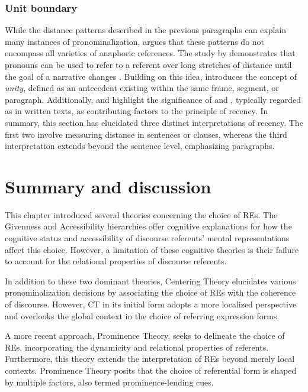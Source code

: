 \subsubsection{Unit boundary} While the distance patterns described in the previous paragraphs can explain many instances of pronominalization, \citet{Fox1987} argues that these patterns do not encompass all varieties of anaphoric references.  The study by \citeauthor{Fox1987} demonstrates that pronouns can be used to refer to a referent over long stretches of distance until the goal of a narrative changes \citep[cited in][]{Smith2003}. Building on this idea, \citet{ariel1990accessing} introduces the concept of \textit{unity}, defined as an antecedent existing within the same frame, segment, or paragraph. Additionally, \citet{vonk1992use} and \citet{Tomlin1987} highlight the significance of  and , typically regarded as  in written texts, as contributing factors to the principle of recency.
In summary, this section has elucidated three distinct interpretations of recency. The first two involve measuring distance in sentences or clauses, whereas the third interpretation extends beyond the sentence level, emphasizing paragraphs.


\section{Summary and discussion}
\begin{sloppypar}
This chapter introduced several theories concerning the choice of REs. The Givenness and Accessibility hierarchies offer cognitive explanations for how the cognitive status and accessibility of discourse referents' mental representations affect this choice. However, a limitation of these cognitive theories is their failure to account for the relational properties of discourse referents. 
\end{sloppypar}

In addition to these two dominant theories, Centering Theory elucidates various pronominalization decisions by associating the choice of REs with the coherence of discourse. However, CT in its initial form adopts a more localized perspective and overlooks the global context in the choice of referring expression forms. 

A more recent approach, Prominence Theory, seeks to delineate the choice of REs, incorporating the dynamicity and relational properties of referents. Furthermore, this theory extends the interpretation of REs beyond merely local contexts. Prominence Theory posits that the choice of referential form is shaped by multiple factors, also termed prominence-lending cues. 

